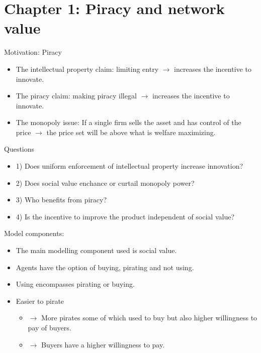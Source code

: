 \documentclass{beamer}
\numberwithin{equation}{section}
\begin{document}
\section{Chapter 1: Piracy and network value}
\begin{frame}{Motivation: Piracy}
\begin{itemize}
    \item The intellectual property claim: limiting entry $\rightarrow$ increases the incentive to innovate.
    \item The piracy claim: making piracy illegal $\rightarrow$ increases the incentive to innovate.
    \item The monopoly issue: If a single firm sells the asset and has control of the price $\rightarrow$ the price set will be above what is welfare maximizing. 
\end{itemize}
\end{frame}
\begin{frame}{Questions}
\begin{itemize}
    \item 1) Does uniform enforcement of intellectual property increase innovation?
    \item 2) Does social value enchance or curtail monopoly power?
    \item 3) Who benefits from piracy? 
    \item 4) Is the incentive to improve the product independent of social value? 
\end{itemize}
\end{frame}
\begin{frame}{Model components:}
\begin{itemize}
    \item The main modelling component used is social value.
    \item Agents have the option of buying, pirating and not using.
    \item Using encompasses pirating or buying. 
    \item Easier to pirate 
        \begin{itemize}
            \item  $\rightarrow$ More pirates some of which used to buy but also higher willingness to pay of buyers. 
            \item  $\rightarrow$ Buyers have a higher willingness to pay.
        \end{itemize}
\end{itemize}
\end{frame}
\end{document}
